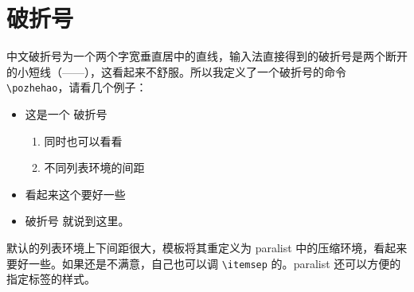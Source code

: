 \documentclass[../Main/thesis.tex]{subfiles}
\begin{document}
\section{破折号}
\label{sec:pozhehao}

中文破折号为一个两个字宽垂直居中的直线，输入法直接得到的破折号是两个断开的小短线（——），这看起来不舒服。所以我定义了一个破折号的命令 \verb|\pozhehao|，请看几个例子：
\begin{itemize}
  \item 这是一个 \pozhehao 破折号
        \begin{enumerate}[(1)]
          \item 同时也可以看看
          \item 不同列表环境的间距
        \end{enumerate}
  \item 看起来这个要好一些
  \item 破折号 \pozhehao 就说到这里。
\end{itemize}

默认的列表环境上下间距很大，模板将其重定义为 \textsf{paralist} 中的压缩环境，看起来要好一些。如果还是不满意，自己也可以调 \verb|\itemsep| 的。\textsf{paralist} 还可以方便的指定标签的样式。
\end{document}
